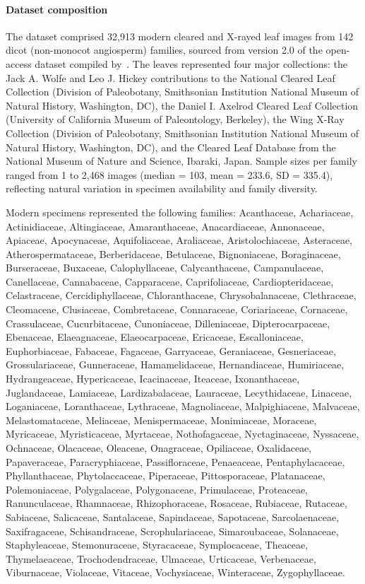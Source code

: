 \documentclass[pdflatex,lineno,sn-nature]{sn-jnl}%
\theoremstyle{plain}%
\theoremstyle{definition}%
\theoremstyle{remark}%
\begin{document}
\paragraph{Dataset composition}
The dataset comprised 32,913 modern cleared and X-rayed leaf images from 142 dicot (non-monocot angiosperm) families, sourced from version 2.0 of the open-access dataset compiled by~\citet{Wilf2024LeafDatasetV2}. The leaves represented four major collections: the Jack A. Wolfe and Leo J. Hickey contributions to the National Cleared Leaf Collection (Division of Paleobotany, Smithsonian Institution National Museum of Natural History, Washington, DC), the Daniel I. Axelrod Cleared Leaf Collection (University of California Museum of Paleontology, Berkeley), the Wing X-Ray Collection (Division of Paleobotany, Smithsonian Institution National Museum of Natural History, Washington, DC), and the Cleared Leaf Database from the National Museum of Nature and Science, Ibaraki, Japan. Sample sizes per family ranged from 1 to 2,468 images (median = 103, mean = 233.6, SD = 335.4), reflecting natural variation in specimen availability and family diversity.


Modern specimens represented the following families: Acanthaceae, Achariaceae, Actinidiaceae, Altingiaceae, Amaranthaceae, Anacardiaceae, Annonaceae, Apiaceae, Apocynaceae, Aquifoliaceae, Araliaceae, Aristolochiaceae, Asteraceae, Atherospermataceae, Berberidaceae, Betulaceae, Bignoniaceae, Boraginaceae, Burseraceae, Buxaceae, Calophyllaceae, Calycanthaceae, Campanulaceae, Canellaceae, Cannabaceae, Capparaceae, Caprifoliaceae, Cardiopteridaceae, Celastraceae, Cercidiphyllaceae, Chloranthaceae, Chrysobalanaceae, Clethraceae, Cleomaceae, Clusiaceae, Combretaceae, Connaraceae, Coriariaceae, Cornaceae, Crassulaceae, Cucurbitaceae, Cunoniaceae, Dilleniaceae, Dipterocarpaceae, Ebenaceae, Elaeagnaceae, Elaeocarpaceae, Ericaceae, Escalloniaceae, Euphorbiaceae, Fabaceae, Fagaceae, Garryaceae, Geraniaceae, Gesneriaceae, Grossulariaceae, Gunneraceae, Hamamelidaceae, Hernandiaceae, Humiriaceae, Hydrangeaceae, Hypericaceae, Icacinaceae, Iteaceae, Ixonanthaceae, Juglandaceae, Lamiaceae, Lardizabalaceae, Lauraceae, Lecythidaceae, Linaceae, Loganiaceae, Loranthaceae, Lythraceae, Magnoliaceae, Malpighiaceae, Malvaceae, Melastomataceae, Meliaceae, Menispermaceae, Monimiaceae, Moraceae, Myricaceae, Myristicaceae, Myrtaceae, Nothofagaceae, Nyctaginaceae, Nyssaceae, Ochnaceae, Olacaceae, Oleaceae, Onagraceae, Opiliaceae, Oxalidaceae, Papaveraceae, Paracryphiaceae, Passifloraceae, Penaeaceae, Pentaphylacaceae, Phyllanthaceae, Phytolaccaceae, Piperaceae, Pittosporaceae, Platanaceae, Polemoniaceae, Polygalaceae, Polygonaceae, Primulaceae, Proteaceae, Ranunculaceae, Rhamnaceae, Rhizophoraceae, Rosaceae, Rubiaceae, Rutaceae, Sabiaceae, Salicaceae, Santalaceae, Sapindaceae, Sapotaceae, Sarcolaenaceae, Saxifragaceae, Schisandraceae, Scrophulariaceae, Simaroubaceae, Solanaceae, Staphyleaceae, Stemonuraceae, Styracaceae, Symplocaceae, Theaceae, Thymelaeaceae, Trochodendraceae, Ulmaceae, Urticaceae, Verbenaceae, Viburnaceae, Violaceae, Vitaceae, Vochysiaceae, Winteraceae, Zygophyllaceae.
\end{document}
